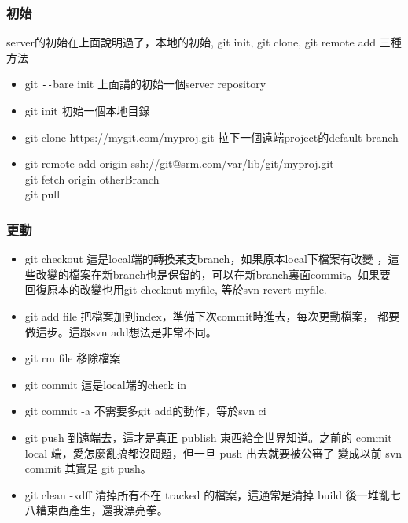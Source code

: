   \subsubsection{初始}
  server的初始在上面說明過了，本地的初始, git init, git clone, git remote add
  三種方法
  \begin{itemize}
    \item git \verb=--=bare init 上面講的初始一個server repository
    \item git init 初始一個本地目錄
    \item git clone https://mygit.com/myproj.git 拉下一個遠端project的default branch
    \item git remote add origin ssh://git@srm.com/var/lib/git/myproj.git\\
          git fetch origin otherBranch\\
          git pull\\
  \end{itemize}
  \subsubsection{更動}
  \begin{itemize}
    \item git checkout 這是local端的轉換某支branch，如果原本local下檔案有改變
      ，這些改變的檔案在新branch也是保留的，可以在新branch裏面commit。如果要
      回復原本的改變也用git checkout myfile, 等於svn revert myfile.
    \item git add file 把檔案加到index，準備下次commit時進去，每次更動檔案，
      都要做這步。這跟svn add想法是非常不同。
    \item git rm file 移除檔案
    \item git commit 這是local端的check in
    \item git commit -a 不需要多git add的動作，等於svn ci
    \item git push 到遠端去，這才是真正 publish 東西給全世界知道。之前的
      commit local 端，愛怎麼亂搞都沒問題，但一旦 push 出去就要被公審了
      變成以前 svn commit 其實是 git push。
    \item git clean -xdff 清掉所有不在 tracked 的檔案，這通常是清掉 build
      後一堆亂七八糟東西產生，還我漂亮拳。
  \end{itemize}
